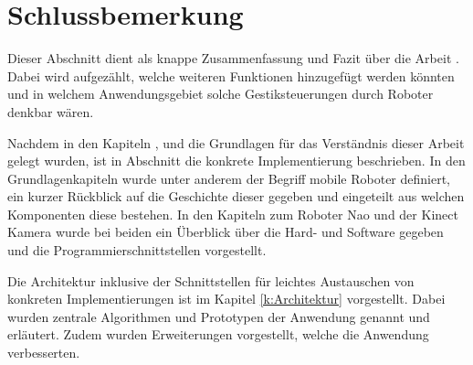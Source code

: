 \chapter{Schlussbemerkung}
Dieser Abschnitt dient als knappe Zusammenfassung und Fazit über die Arbeit \Titel. Dabei wird aufgezählt, welche weiteren Funktionen hinzugefügt werden könnten und in welchem Anwendungsgebiet solche Gestiksteuerungen durch Roboter denkbar wären.

Nachdem in den Kapiteln ,  und  die Grundlagen für das Verständnis dieser Arbeit gelegt wurden, ist in Abschnitt  die konkrete Implementierung beschrieben. In den Grundlagenkapiteln wurde unter anderem der Begriff mobile Roboter definiert, ein kurzer Rückblick auf die Geschichte dieser gegeben und eingeteilt aus welchen Komponenten diese bestehen. In den Kapiteln zum Roboter Nao und der Kinect Kamera wurde bei beiden ein Überblick über die Hard- und Software gegeben und die Programmierschnittstellen vorgestellt.

Die Architektur inklusive der Schnittstellen für leichtes Austauschen von konkreten Implementierungen ist im Kapitel \ref{k:Architektur} vorgestellt. Dabei wurden zentrale Algorithmen und Prototypen der Anwendung genannt und erläutert. Zudem wurden Erweiterungen vorgestellt, welche die Anwendung verbesserten.


